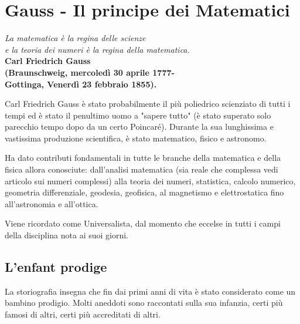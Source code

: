
\chapter{Gauss - Il principe dei Matematici}
\begin{minipage}{1.46\linewidth}
	\begin{flushright}
		\emph{La matematica è la regina delle scienze \\ e la teoria dei numeri è la regina della matematica.}\\
		\vspace{0.5cm}
		\bfseries{Carl Friedrich Gauss} \\
		\textnormal{(Braunschweig, mercoledì 30 aprile 1777-\\Gottinga, Venerdì 23 febbraio 1855)}.
	\end{flushright}
\end{minipage}

Carl Friedrich Gauss è stato probabilmente il più poliedrico scienziato di tutti i tempi ed è stato il penultimo uomo a "sapere tutto" (è stato superato solo parecchio tempo dopo da un certo Poincaré). Durante la sua lunghissima e vastissima produzione scientifica, è stato matematico, fisico e astronomo.

Ha dato contributi fondamentali in tutte le branche della matematica e della fisica allora conosciute: dall'analisi matematica (sia reale che complessa vedi articolo sui numeri complessi) alla teoria dei numeri, statistica, calcolo numerico, geometria differenziale, geodesia, geofisica, al magnetismo e elettrostatica fino all'astronomia e all'ottica.



Viene ricordato come Universalista, dal momento che eccelse in tutti i campi della disciplina nota ai suoi giorni.

\section{L'enfant prodige}

La storiografia insegna che fin dai primi anni di vita è stato considerato come un bambino prodigio. Molti aneddoti sono raccontati sulla sua infanzia, certi più famosi di altri, certi più accreditati di altri.

